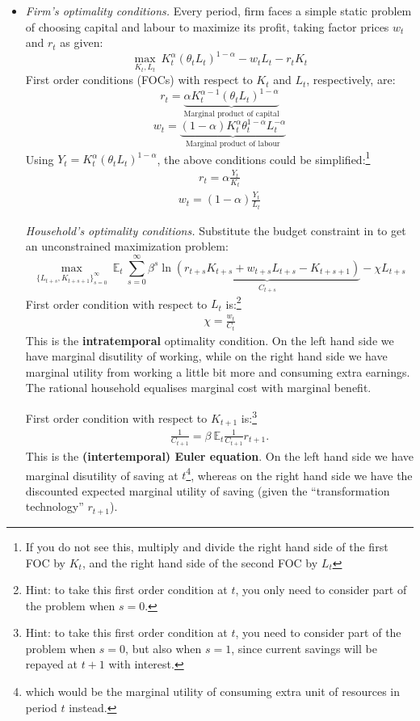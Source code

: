 \documentclass[authoryear,11pt]{elsarticle}
\begin{document}
\begin{itemize}
	\item \emph{Firm's optimality conditions.} Every period, firm faces a simple static problem of choosing capital and labour to maximize its profit, taking factor prices $w_t$ and $r_t$ as given:
	\[
		\max_{K_t,L_t} \ K_t^\alpha (\theta_tL_t)^{1-\alpha} - w_tL_t - r_tK_t
	\]
	First order conditions (FOCs) with respect to $K_t$ and $L_t$, respectively, are:
	\[
		r_t = \underbrace{\alpha K_t^{\alpha-1}(\theta_tL_t)^{1-\alpha}}_{\text{Marginal product of capital}}
	\]
	\[
		w_t = \underbrace{(1-\alpha) K_t^{\alpha}\theta_t^{1-\alpha}L_t^{-\alpha}}_{\text{Marginal product of labour}}
	\]
	Using $Y_t = K_t^\alpha(\theta_tL_t)^{1-\alpha}$, the above conditions could be simplified:\footnote{If you do not see this, multiply and divide the right hand side of the first FOC by $K_t$, and the right hand side of the second FOC by $L_t$}
	\begin{gather}
		r_t= \alpha \frac{Y_t}{K_t}
		\label{eq:firm_foc_k}
	\end{gather}
	\begin{gather}
		w_t = (1-\alpha) \frac{Y_t}{L_t}
		\label{eq:firm_foc_l}
	\end{gather}
	
	\emph{Household's optimality conditions.} Substitute the budget constraint in to get an unconstrained maximization problem:
	\[
		\max_{\{L_{t+s},K_{t+s+1}\}_{s=0}^\infty} \ \mathbb{E}_t \ \sum_{s=0}^{\infty} \beta^s \ln \underbrace{\left(r_{t+s} K_{t+s} + w_{t+s} L_{t+s} - K_{t+s+1}\right) }_{C_{t+s}}- \chi L_{t+s}
	\]
	First order condition with respect to $L_t$ is:\footnote{Hint: to take this first order condition at $t$, you only need to consider part of the problem when $s=0$.}
	\begin{gather}
		\chi = \frac{w_t}{C_t}
		\label{eq:hh_foc_l}
	\end{gather}
	This is the \textbf{intratemporal} optimality condition. On the left hand side we have marginal disutility of working, while on the right hand side we have marginal utility from working a little bit more and consuming extra earnings. The rational household equalises marginal cost with marginal benefit.
	
	First order condition with respect to $K_{t+1}$ is:\footnote{Hint: to take this first order condition at $t$, you need to consider part of the problem when $s=0$, but also when $s=1$, since current savings will be repayed at $t+1$ with interest.}
	\begin{gather}
		\frac{1}{C_{t+1}} = \beta \ \mathbb{E}_t \frac{1}{C_{t+1}} r_{t+1}.
		\label{eq:euler}
	\end{gather}
	This is the \textbf{(intertemporal) Euler equation}. On the left hand side we have marginal disutility of saving at $t$\footnote{which would be the marginal utility of consuming extra unit of resources in period $t$ instead.}, whereas on the right hand side we have the discounted expected marginal utility of saving (given the ``transformation technology'' $r_{t+1}$).
	

\end{itemize}
\end{document}
